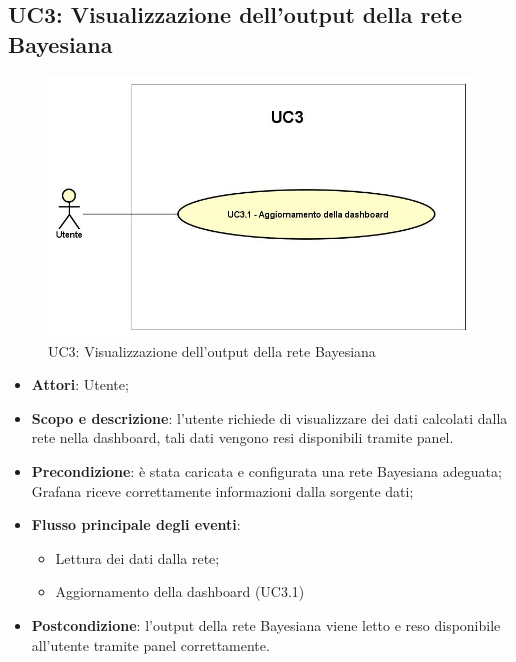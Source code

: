 \subsection{UC3: Visualizzazione dell'output della rete Bayesiana}
\hypertarget{UC3}{}
\begin{figure} [H]
	\centering
	\includegraphics[scale=0.45]{Img/UC3}
	\caption{UC3: Visualizzazione dell'output della rete Bayesiana}\label{}
\end{figure}
\begin{itemize}
	\item \textbf{Attori}: Utente;
	\item \textbf{Scopo e descrizione}: l'utente richiede di visualizzare dei dati calcolati dalla rete nella dashboard, tali dati vengono resi disponibili tramite panel.
	\item \textbf{Precondizione}: è stata caricata e configurata una rete Bayesiana adeguata; Grafana riceve correttamente informazioni dalla sorgente dati;
	\item \textbf{Flusso principale degli eventi}:
	\begin{itemize}
		\item Lettura dei dati dalla rete;
		\item Aggiornamento della dashboard (UC3.1)
	\end{itemize}
	\item \textbf{Postcondizione}: l'output della rete Bayesiana viene letto e reso disponibile all'utente tramite panel correttamente.
\end{itemize}
